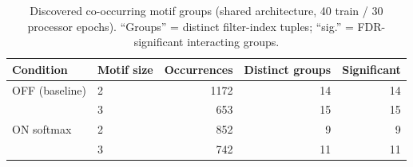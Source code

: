 \begin{table}[h]\centering
\caption{Discovered co-occurring motif groups (shared architecture, 40 train / 30 processor epochs). ``Groups'' = distinct filter-index tuples; ``sig.'' = FDR-significant interacting groups.}\label{tab:exp2}
\begin{tabular}{llrrr}\toprule
Condition & Motif size & Occurrences & Distinct groups & Significant \\ \midrule
OFF (baseline) & 2 & 1172 & 14 & 14 \\
 & 3 & 653 & 15 & 15 \\
\midrule
ON softmax & 2 & 852 & 9 & 9 \\
 & 3 & 742 & 11 & 11 \\
\midrule
\bottomrule\end{tabular}\end{table}

